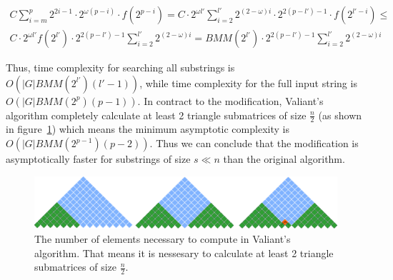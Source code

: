 \begin{equation*}
\begin{array}{c}
C \sum\limits_{i=m}^p 2^{2i - 1} \cdot 2^{\omega(p - i)} \cdot f(2^{p - i}) =
C \cdot 2^{\omega l'}\sum\limits_{i=2}^{l'} 2^{(2 - \omega)i} \cdot 2^{2(p - l') - 1} \cdot f(2^{l' - i}) \le \\
C \cdot 2^{\omega l'} f(2^{l'}) \cdot 2^{2(p - l') - 1} \sum\limits_{i=2}^{l'} 2^{(2 - \omega)i} =
BMM(2^{l'}) \cdot 2^{2(p - l') - 1} \sum\limits_{i=2}^{l'} 2^{(2 - \omega)i}
\end{array}
\end{equation*}

Thus, time complexity for searching all substrings is  $O(|G|BMM(2^{l'})(l' - 1))$, while time complexity for the full input string is $O(|G|BMM(2^p)(p - 1))$. 
In contract to the modification, Valiant's algorithm completely calculate at least 2 triangle submatrices of size $\frac{n}{2}$ (as shown in figure~\ref{fig5}) which means the minimum asymptotic complexity is $O(|G|BMM(2^{p - 1})(p - 2))$. Thus we can conclude that the modification is asymptotically faster for substrings of size $s \ll n$  than the original algorithm.

\begin{figure}
\vspace{3mm}
 \begin{center}
 \includegraphics[width=12cm]{pictures/valsubstring.pdf}
    \caption{The number of elements necessary to compute in Valiant's algorithm. That means it is nessesary to calculate at least 2 triangle submatrices of size $\frac{n}{2}$.}
    \label{fig5}
 \end{center}
\vspace{-8mm}
\end{figure}
